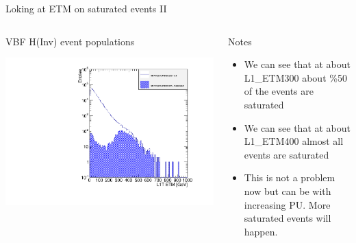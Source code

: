\documentclass[8pt]{beamer}
\begin{document}
\begin{frame}{Loking at ETM on saturated events II}

\begin{columns}
 
\begin{block}{VBF H(Inv) event populations}
\centering

\includegraphics[width=\linewidth]{fig/L1ETM_Overlap.pdf}

\end{block}

\begin{block}{Notes}

\begin{itemize}
  \item We can see that at about L1\_ETM300 about \%50 of the events are saturated 
  \item We can see that at about L1\_ETM400 almost all events are saturated
  \item This is not a problem now but can be with increasing PU. More saturated events will happen.
\end{itemize}

\end{block}

\end{columns}
 
\end{frame}
\end{document}
